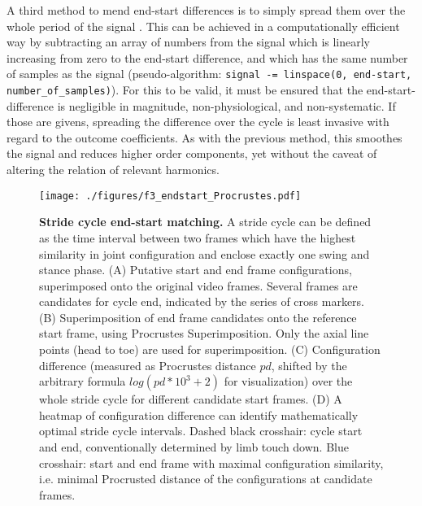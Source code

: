 A third method to mend end-start differences is to simply spread them over the whole period of the signal \citep{Mielke2019}.
This can be achieved in a computationally efficient way by subtracting an array of numbers from the signal which is linearly increasing from zero to the end-start difference, and which has the same number of samples as the signal (pseudo-algorithm: \texttt{signal -= linspace(0, end-start, number\_of\_samples)}).
For this to be valid, it must be ensured that the end-start-difference is negligible in magnitude, non-physiological, and non-systematic.
If those are givens, spreading the difference over the cycle is least invasive with regard to the outcome coefficients.
As with the previous method, this smoothes the signal and reduces higher order components, yet without the caveat of altering the relation of relevant harmonics.



\begin{figure}[pt]
\centering
\texttt{[image: ./figures/f3\_endstart\_Procrustes.pdf]}
\caption{\label{fig:endstart}\textbf{Stride cycle end-start matching.} A stride cycle can be defined as the time interval between two frames which have the highest similarity in joint configuration and enclose exactly one swing and stance phase. (A) Putative start and end frame configurations, superimposed onto the original video frames. Several frames are candidates for cycle end, indicated by the series of cross markers. (B) Superimposition of end frame candidates onto the reference start frame, using Procrustes Superimposition. Only the axial line points (head to toe) are used for superimposition. (C) Configuration difference (measured as Procrustes distance \(pd\), shifted by the arbitrary formula \(log\left(pd*10^3+2\right)\) for visualization) over the whole stride cycle for different candidate start frames. (D) A heatmap of configuration difference can identify mathematically optimal stride cycle intervals. Dashed black crosshair: cycle start and end, conventionally determined by limb touch down. Blue crosshair: start and end frame with maximal configuration similarity, i.e. minimal Procrusted distance of the configurations at candidate frames.}
\end{figure}

